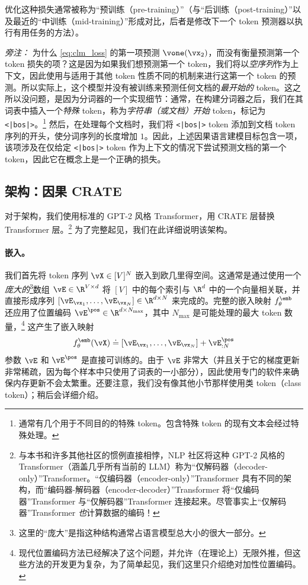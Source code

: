\documentclass[../../book-main_zh.tex]{subfiles}
\begin{document}
优化这种损失通常被称为“预训练（pre-training）”（与“后训练（post-training）”以及最近的“中训练（mid-training）”形成对比，后者是修改下一个 token 预测器以执行有用任务的方法）。

\textit{旁注：} 为什么 \eqref{eq:clm_loss} 的第一项预测 \(\vone(\vx_{2})\)，而没有衡量预测第一个 token 损失的项？这是因为如果我们想预测第一个 token，我们将以\textit{空序列}作为上下文，因此使用与适用于其他 token 性质不同的机制来进行这第一个 token 的预测。所以实际上，这个模型并没有被训练来预测任何文档的\textit{最开始的} token。这之所以没问题，是因为分词器的一个实现细节：通常，在构建分词器之后，我们在其词表中插入一个\textit{特殊} token，称为\textit{字符串（或文档）开始} token，标记为 \texttt{<|bos|>}。\footnote{通常有几个用于不同目的的特殊 token。包含特殊 token 的现有文本会经过特殊处理。} 然后，在处理每个文档时，我们将 \texttt{<|bos|>} token 添加到文档 token 序列的开头，使分词序列的长度增加 \(1\)。因此，上述因果语言建模目标包含一项，该项涉及在仅给定 \texttt{<|bos|>} token 作为上下文的情况下尝试预测文档的第一个 token，因此它在概念上是一个正确的损失。

\subsection{架构：因果 CRATE}

对于架构，我们使用标准的 GPT-2 风格 Transformer，用 CRATE 层替换 Transformer 层。\footnote{与本书和许多其他社区的惯例直接相悖，NLP 社区将这种 GPT-2 风格的 Transformer（涵盖几乎所有当前的 LLM）称为“仅解码器（decoder-only）”Transformer。“仅编码器（encoder-only）”Transformer 具有不同的架构，而“编码器-解码器（encoder-decoder）”Transformer 将“仅编码器”Transformer 与“仅解码器”Transformer 连接起来。尽管事实上“仅解码器”Transformer \textit{也}计算数据的编码！} 为了完整起见，我们在此详细说明该架构。

\paragraph{嵌入。} 我们首先将 token 序列 \(\vX \in
[V]^{N}\) 嵌入到欧几里得空间。这通常是通过使用一个\textit{庞大的}\footnote{这里的“庞大”是指这种结构通常占语言模型总大小的很大一部分。}数组 \(\vE \in \R^{V \times d}\) 将 \([V]\) 中的每个索引与 \(\R^{d}\) 中的一个向量相关联，并直接形成序列 \([\vE_{\vx_{1}}, \dots, \vE_{\vx_{N}}] \in \R^{d \times
N}\) 来完成的。完整的嵌入映射 \(f_{\theta}^{\emb}\) 还应用了位置编码 \(\vE^{\pos} \in \R^{d  \times N_{\max}}\)，其中 \(N_{\max}\) 是可能处理的最大 token 数量，\footnote{现代位置编码方法已经解决了这个问题，并允许（在理论上）无限外推，但这些方法的开发更为复杂，为了简单起见，我们这里只介绍绝对加性位置编码。} 这产生了嵌入映射
\begin{equation}
f_{\theta}^{\emb}(\vX) \doteq [\vE_{\vx_{1}}, \dots, \vE_{\vx_{N}}] +
\vE_{:N}^{\pos}
\end{equation}
参数 \(\vE\) 和 \(\vE^{\pos}\) 是直接可训练的。由于 \(\vE\) 非常大（并且关于它的梯度更新非常稀疏，因为每个样本中只使用了词表的一小部分），因此使用专门的软件来确保内存更新不会太繁重。还要注意，我们没有像其他小节那样使用类 token（class token）；稍后会详细介绍。
\end{document}
